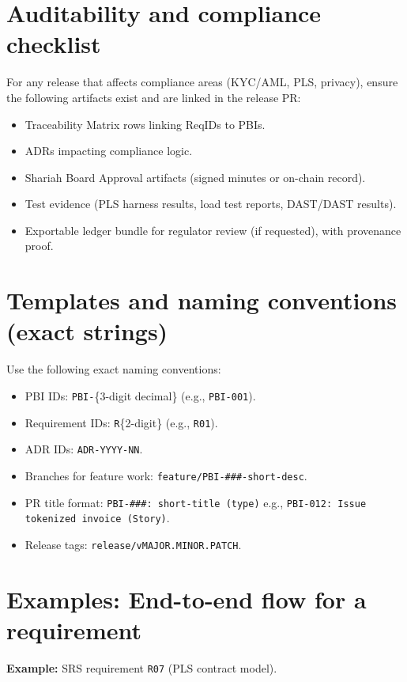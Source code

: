 \documentclass[11pt,a4paper]{article}
\begin{document}
\section{Auditability and compliance checklist}
For any release that affects compliance areas (KYC/AML, PLS, privacy), ensure the following artifacts exist and are linked in the release PR:
\begin{itemize}
  \item Traceability Matrix rows linking ReqIDs to PBIs.
  \item ADRs impacting compliance logic.
  \item Shariah Board Approval artifacts (signed minutes or on-chain record).
  \item Test evidence (PLS harness results, load test reports, DAST/DAST results).
  \item Exportable ledger bundle for regulator review (if requested), with provenance proof.
\end{itemize}

\section{Templates and naming conventions (exact strings)}
Use the following exact naming conventions:

\begin{itemize}
  \item PBI IDs: \texttt{PBI-}\{3-digit decimal\} (e.g., \texttt{PBI-001}).
  \item Requirement IDs: \texttt{R}\{2-digit\} (e.g., \texttt{R01}).
  \item ADR IDs: \texttt{ADR-YYYY-NN}.
  \item Branches for feature work: \texttt{feature/PBI-\#\#\#-short-desc}.
  \item PR title format: \texttt{PBI-\#\#\#: short-title (type)} e.g., \texttt{PBI-012: Issue tokenized invoice (Story)}.
  \item Release tags: \texttt{release/vMAJOR.MINOR.PATCH}.
\end{itemize}

\section{Examples: End-to-end flow for a requirement}
\textbf{Example:} SRS requirement \texttt{R07} (PLS contract model).
\end{document}
